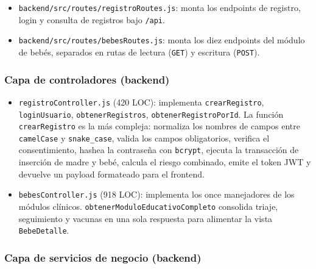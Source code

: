 \documentclass[12pt,letterpaper]{article}
\begin{document}
\begin{itemize}
    \item \texttt{backend/src/routes/registroRoutes.js}: monta los endpoints de registro, login y consulta de registros bajo \texttt{/api}.
    \item \texttt{backend/src/routes/bebesRoutes.js}: monta los diez endpoints del módulo de bebés, separados en rutas de lectura (\texttt{GET}) y escritura (\texttt{POST}).
\end{itemize}

\subsubsection{Capa de controladores (backend)}

\begin{itemize}
    \item \texttt{registroController.js} (420 LOC): implementa \texttt{crearRegistro}, \texttt{loginUsuario}, \texttt{obtenerRegistros}, \texttt{obtenerRegistroPorId}. La función \texttt{crearRegistro} es la más compleja: normaliza los nombres de campos entre \texttt{camelCase} y \texttt{snake\_case}, valida los campos obligatorios, verifica el consentimiento, hashea la contraseña con \texttt{bcrypt}, ejecuta la transacción de inserción de madre y bebé, calcula el riesgo combinado, emite el token JWT y devuelve un payload formateado para el frontend.
    \item \texttt{bebesController.js} (918 LOC): implementa los once manejadores de los módulos clínicos. \texttt{obtenerModuloEducativoCompleto} consolida triaje, seguimiento y vacunas en una sola respuesta para alimentar la vista \texttt{BebeDetalle}.
\end{itemize}

\subsubsection{Capa de servicios de negocio (backend)}
\end{document}
